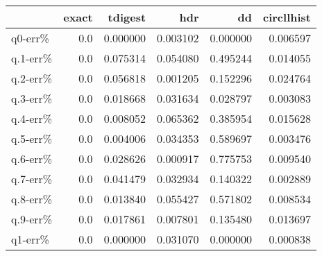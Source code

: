 \begin{tabular}{lrrrrr}
\toprule
{} &  exact &   tdigest &       hdr &        dd &  circllhist \\
\midrule
q0-err\%  &    0.0 &  0.000000 &  0.003102 &  0.000000 &    0.006597 \\
q.1-err\% &    0.0 &  0.075314 &  0.054080 &  0.495244 &    0.014055 \\
q.2-err\% &    0.0 &  0.056818 &  0.001205 &  0.152296 &    0.024764 \\
q.3-err\% &    0.0 &  0.018668 &  0.031634 &  0.028797 &    0.003083 \\
q.4-err\% &    0.0 &  0.008052 &  0.065362 &  0.385954 &    0.015628 \\
q.5-err\% &    0.0 &  0.004006 &  0.034353 &  0.589697 &    0.003476 \\
q.6-err\% &    0.0 &  0.028626 &  0.000917 &  0.775753 &    0.009540 \\
q.7-err\% &    0.0 &  0.041479 &  0.032934 &  0.140322 &    0.002889 \\
q.8-err\% &    0.0 &  0.013840 &  0.055427 &  0.571802 &    0.008534 \\
q.9-err\% &    0.0 &  0.017861 &  0.007801 &  0.135480 &    0.013697 \\
q1-err\%  &    0.0 &  0.000000 &  0.031070 &  0.000000 &    0.000838 \\
\bottomrule
\end{tabular}
